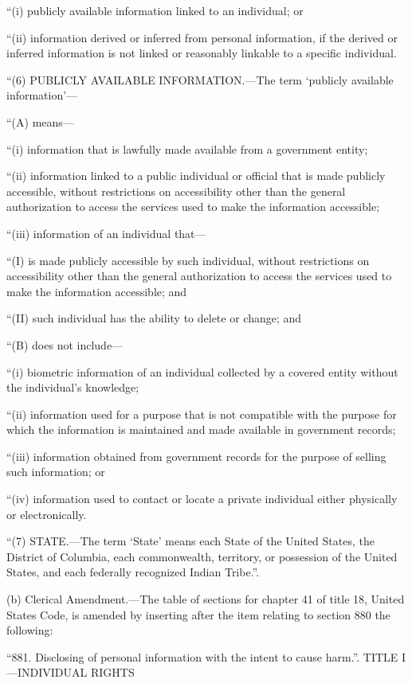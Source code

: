 “(i) publicly available information linked to an individual; or

“(ii) information derived or inferred from personal information, if the derived or inferred information is not linked or reasonably linkable to a specific individual.

“(6) PUBLICLY AVAILABLE INFORMATION.—The term ‘publicly available information’—

“(A) means—

“(i) information that is lawfully made available from a government entity;

“(ii) information linked to a public individual or official that is made publicly accessible, without restrictions on accessibility other than the general authorization to access the services used to make the information accessible;

“(iii) information of an individual that—

“(I) is made publicly accessible by such individual, without restrictions on accessibility other than the general authorization to access the services used to make the information accessible; and

“(II) such individual has the ability to delete or change; and

“(B) does not include—

“(i) biometric information of an individual collected by a covered entity without the individual’s knowledge;

“(ii) information used for a purpose that is not compatible with the purpose for which the information is maintained and made available in government records;

“(iii) information obtained from government records for the purpose of selling such information; or

“(iv) information used to contact or locate a private individual either physically or electronically.

“(7) STATE.—The term ‘State’ means each State of the United States, the District of Columbia, each commonwealth, territory, or possession of the United States, and each federally recognized Indian Tribe.”.

(b) Clerical Amendment.—The table of sections for chapter 41 of title 18, United States Code, is amended by inserting after the item relating to section 880 the following:


“881. Disclosing of personal information with the intent to cause harm.”.
TITLE I—INDIVIDUAL RIGHTS

